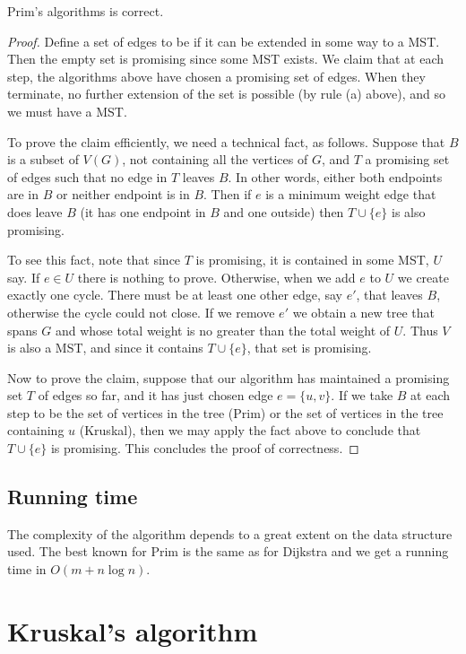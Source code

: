 \begin{Theorem} \label{thm:prim}
Prim's algorithms is correct.
\begin{proof}
Define a set of edges to be  if it can be extended in some way to a MST. 
Then the empty set is promising since some MST exists. 
We claim that at each step, the algorithms above have chosen a promising set of edges. 
When they terminate, no further extension of the set is possible (by rule (a) above), 
and so we must have a MST.

To prove the claim efficiently, we need a technical fact, as follows.
Suppose that $B$ is a subset of $V(G)$, not containing all the vertices
of $G$, and $T$ a promising set of edges such that no edge in $T$ leaves
$B$. In other words, either both endpoints are in $B$ or neither
endpoint is in $B$. Then if $e$ is a minimum weight edge that does leave
$B$ (it has one endpoint in $B$ and one outside) then $T\cup\{e\}$ is
also promising.

To see this fact, note that since $T$ is promising, it is contained in
some MST, $U$ say. If $e\in U$ there is nothing to prove. Otherwise,
when we add $e$ to $U$ we create exactly one cycle. There must be at
least one other edge, say $e'$, that leaves $B$, otherwise the cycle
could not close. If we remove $e'$ we obtain a new tree that spans $G$
and whose total weight is no greater than the total weight of $U$. Thus
$V$ is also a MST, and since it contains $T\cup\{e\}$, that set is
promising.

Now to prove the claim, suppose that our algorithm has maintained a
promising set $T$ of edges so far, and it has just chosen edge $e=\{u,v\}$.
If we take $B$ at each step to be the set of vertices in the tree (Prim)
or the set of vertices in the tree containing $u$ (Kruskal), then we may
apply the fact above to conclude that $T \cup \{e\}$ is promising. This
concludes the proof of correctness.
\end{proof}
\end{Theorem}

\subsection{Running time}
The complexity of the algorithm depends to a great extent on the data
structure used. The best known for Prim is the same as for Dijkstra
and we  get a running time in $O(m + n\log n)$.

\section{Kruskal's algorithm}

